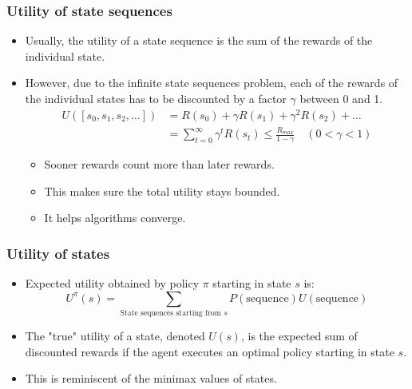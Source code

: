 \documentclass[11pt]{article}
\begin{document}
\subsubsection{Utility of state sequences}
\label{sec:org1c79ada}
\begin{itemize}
\item Usually, the utility of a state sequence is the sum of the rewards of the individual state.
\item However, due to the infinite state sequences problem, each of the rewards of the individual states has to be discounted by a factor \(\gamma\) between 0 and 1.
\begin{align*}
U([s_0, s_1, s_2, \ldots]) &= R(s_0) + \gamma R (s_1) + \gamma^2 R(s_2) + \ldots \\
&= \sum_{t = 0}^{\infty} \gamma^t R(s_t) \le \frac{R_{max}}{1 - \gamma} \quad (0 < \gamma < 1)
\end{align*}
\begin{itemize}
\item Sooner rewards count more than later rewards.
\item This makes sure the total utility stays bounded.
\item It helps algorithms converge.
\end{itemize}
\end{itemize}
\subsubsection{Utility of states}
\label{sec:org58bb948}
\begin{itemize}
\item Expected utility obtained by policy \(\pi\) starting in state \(s\) is:
\[U^{\pi} (s) = \sum_{\text{State sequences starting from } s} P (\text{sequence}) U (\text{sequence})\]
\item The "true" utility of a state, denoted \(U(s)\), is the expected sum of discounted rewards if the agent executes an optimal policy starting in state \(s\).
\item This is reminiscent of the minimax values of states.
\end{itemize}
\end{document}
